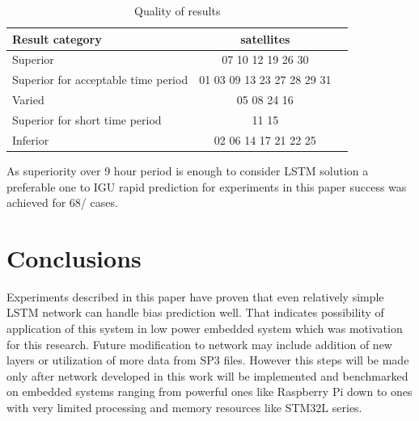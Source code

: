 \documentclass{kybernetika}
\begin{document}
\begin{table}[ht] \label{table:result}
\parindent0pt
\caption{Quality of results }
\centering
\begin{tabular}{ l  c  c }
  \hline
  \hline
  Result category & satellites\\  \hline
  Superior & 07 10 12 19 26 30\\  
  Superior for acceptable time period& 01 03 09 13 23 27 28 29 31\\ 
  Varied & 05 08 24 16\\ \hline \hline
  Superior for short time period& 11 15 \\ 
  Inferior & 02 06 14 17 21 22 25\\ 
 \end{tabular}
\end{table}

As superiority over 9 hour period is enough to consider LSTM solution a preferable one to
IGU rapid prediction for experiments in this paper success was achieved for 68/%
cases.

\section{Conclusions}
Experiments described in this paper have proven that even relatively simple LSTM network can
handle bias prediction well. That indicates possibility of application of this system in 
low power embedded system which was motivation for this research. Future modification to network
may include addition of new layers or utilization of more data from SP3 files.
However this steps will be made only after network developed in this work will be implemented and
benchmarked on embedded systems ranging from powerful ones like Raspberry Pi down to ones
with very limited processing and memory resources like STM32L series.
\makesubmdate

{}


\makecontacts
\end{document}
